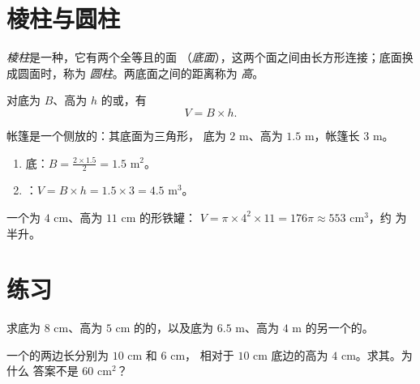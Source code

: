 \section{棱柱与圆柱}

\begin{definition}[棱柱、圆柱]\label{def:g7:areas:prism}
\emph{棱柱}是一种，它有两个全等且的面
（\emph{底面}），这两个面之间由长方形连接；底面换成圆面时，称为
\emph{圆柱}。两底面之间的距离称为
\emph{高}。
\end{definition}

\begin{theorem}[体积]\label{thm:g7:areas:volume}
对底为 $B$、高为 $h$ 的或，有
\[
V = B \times h .
\]
\end{theorem}
\admitted

\begin{example}\label{ex:g7:areas:volume}
帐篷是一个侧放的：其底面为三角形，
底为 $2$ m、高为 $1.5$ m，帐篷长 $3$ m。
\begin{enumerate}
  \item 底：$B = \frac{2 \times 1.5}{2} = 1.5$ m$^2$。
  \item {}：$V = B \times h = 1.5 \times 3 = 4.5$ m$^3$。
\end{enumerate}
一个为 $4$ cm、高为 $11$ cm 的形铁罐：
$V = \pi \times 4^2 \times 11 = 176\pi \approx 553$ cm$^3$，约
为半升。
\end{example}

\section{练习}

\begin{exercise}[$\star$]\label{exo:g7:areas:1}
求底为 $8$ cm、高为
$5$ cm 的的，以及底为 $6.5$ m、高为 $4$ m 的另一个的。
\end{exercise}

\begin{exercise}[$\star$]\label{exo:g7:areas:2}
一个的两边长分别为 $10$ cm 和 $6$ cm，
相对于 $10$ cm 底边的高为 $4$ cm。求其。为什么
答案不是 $60$ cm$^2$？
\end{exercise}


